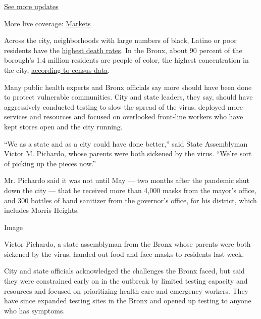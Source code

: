 \href{https://www.nytimes.com/2020/08/01/world/coronavirus-covid-19.html?action=click\&pgtype=Article\&state=default\&region=MAIN_CONTENT_1\&context=storylines_live_updates}{See
more updates}

More live coverage:
\href{https://www.nytimes.com/live/2020/07/31/business/stock-market-today-coronavirus?action=click\&pgtype=Article\&state=default\&region=MAIN_CONTENT_1\&context=storylines_live_updates}{Markets}

Across the city, neighborhoods with large numbers of black, Latino or
poor residents have the
\href{https://www.nytimes.com/2020/05/18/nyregion/coronavirus-deaths-nyc.html}{highest
death rates}. In the Bronx, about 90 percent of the borough's 1.4
million residents are people of color, the highest concentration in the
city,
\href{https://www.census.gov/quickfacts/fact/table/newyorkcitynewyork,bronxcountybronxboroughnewyork,kingscountybrooklynboroughnewyork,newyorkcountymanhattanboroughnewyork,queenscountyqueensboroughnewyork,richmondcountystatenislandboroughnewyork/PST045218}{according
to census data}.

Many public health experts and Bronx officials say more should have been
done to protect vulnerable communities. City and state leaders, they
say, should have aggressively conducted testing to slow the spread of
the virus, deployed more services and resources and focused on
overlooked front-line workers who have kept stores open and the city
running.

``We as a state and as a city could have done better,'' said State
Assemblyman Victor M. Pichardo, whose parents were both sickened by the
virus. ``We're sort of picking up the pieces now.''

Mr. Pichardo said it was not until May --- two months after the pandemic
shut down the city --- that he received more than 4,000 masks from the
mayor's office, and 300 bottles of hand sanitizer from the governor's
office, for his district, which includes Morris Heights.

Image

Victor Pichardo, a state assemblyman from the Bronx whose parents were
both sickened by the virus, handed out food and face masks to residents
last week.

City and state officials acknowledged the challenges the Bronx faced,
but said they were constrained early on in the outbreak by limited
testing capacity and resources and focused on prioritizing health care
and emergency workers. They have since expanded testing sites in the
Bronx and opened up testing to anyone who has symptoms.

